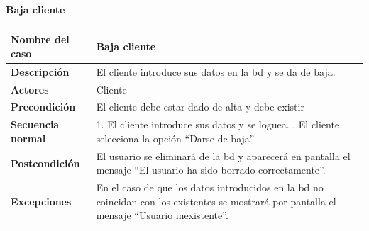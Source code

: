 \paragraph{Baja cliente}
\begin{table}[H]
    \centering
    \small
    \begin{tabularx}{0.8\textwidth}{|p{3.5cm}|X|}
        \hline
        \rowcolor{lightgray}
        \textbf{Nombre del caso}  & \textbf{Baja cliente}                                                                                                                                \\
        \hline
        \textbf{Descripción}      & El cliente introduce sus datos en la \gls{bd} y se da de baja.                                                                                       \\
        \hline
        \textbf{Actores}          & Cliente                                                                                                                                              \\
        \hline
        \textbf{Precondición}     & El cliente debe estar dado de alta y debe existir                                                                                                    \\
        \hline
        \textbf{Secuencia normal} & 1. El cliente introduce sus datos y se loguea. \newline
        2. El cliente selecciona la opción ``Darse de baja''                                                                                                                             \\
        \hline
        \textbf{Postcondición}    & El usuario se eliminará de la \gls{bd} y aparecerá en pantalla el mensaje ``El usuario ha sido borrado correctamente''.                              \\
        \hline
        \textbf{Excepciones}      & En el caso de que los datos introducidos en la \gls{bd} no coincidan con los existentes se mostrará por pantalla el mensaje ``Usuario inexistente''. \\
        \hline
    \end{tabularx}
\end{table}
